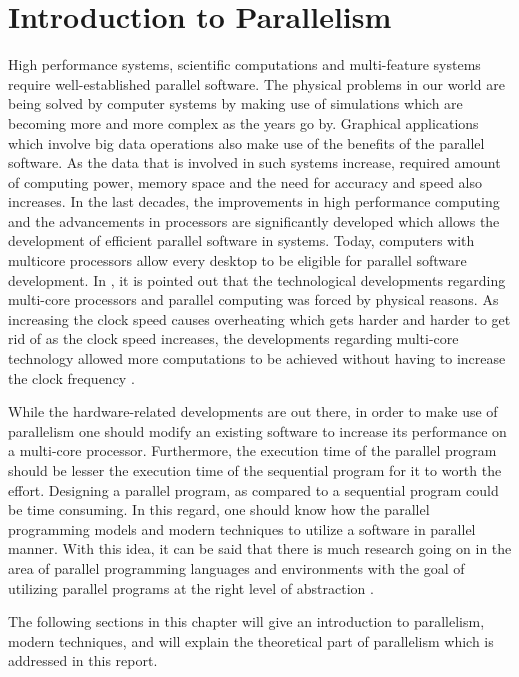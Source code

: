 \section{Introduction to Parallelism} %
High performance systems, scientific computations and multi-feature systems require well-established parallel software. The physical problems in our world are being solved by computer systems by making use of simulations which are becoming more and more complex as the years go by. Graphical applications which involve big data operations also make use of the benefits of the parallel software. As the data that is involved in such systems increase, required amount of computing power, memory space and the need for accuracy and speed also increases. In the last decades, the improvements in high performance computing and the advancements in processors are significantly developed which allows the development of efficient parallel software in systems. Today, computers with multicore processors allow every desktop to be eligible for parallel software development. In \cite{springerparallel}, it is pointed out that the technological developments regarding multi-core processors and parallel computing was forced by physical reasons. As increasing the clock speed causes overheating which gets harder and harder to get rid of as the clock speed increases, the developments regarding multi-core technology allowed more computations to be achieved without having to increase the clock frequency \cite{springerparallel}.

While the hardware-related developments are out there, in order to make use of parallelism one should modify an existing software to increase its performance on a multi-core processor. Furthermore, the execution time of the parallel program should be lesser the execution time of the sequential program for it to worth the effort. Designing a parallel program, as compared to a sequential program could be time consuming. In this regard, one should know how the parallel programming models and modern techniques to utilize a software in parallel manner. With this idea, it can be said that there is much research going on in the area of parallel programming languages and environments with the goal of utilizing parallel programs at the right level of abstraction \cite{springerparallel}.

The following sections in this chapter will give an introduction to parallelism, modern techniques, and will explain the theoretical part of parallelism which is addressed in this report.
